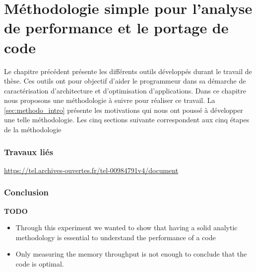 \chapter{Méthodologie simple pour l'analyse de performance et le portage de code}
\label{chap:methodo}
\minitoc

Le chapitre précédent présente les différents outils développés durant le travail de thèse. Ces outils ont pour objectif d'aider le programmeur dans sa démarche de caractérisation d'architecture et d'optimisation d'applications. Dans ce chapitre nous proposons une méthodologie à suivre pour réaliser ce travail. La \autoref{sec:methodo_intro} présente les motivations qui nous ont poussé à développer une telle méthodologie. Les cinq sections suivante correspondent aux cinq étapes de la méthodologie









    

\subsection{Travaux liés}
\url{https://tel.archives-ouvertes.fr/tel-00984791v4/document}


\subsection{Conclusion}

\textbf{TODO}
\begin{itemize}
    \item Through this experiment we wanted to show that having a solid analytic methodology is essential to understand the performance of a code
    \item Only measuring the memory throughput is not enough to conclude that the code is optimal. 
\end{itemize}


\printbibliography[heading=references,segment=\therefsegment]

